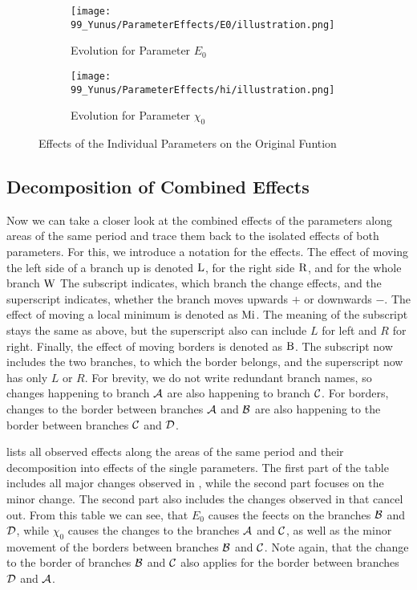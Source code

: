 \begin{figure}
	\centering
	\begin{subfigure}{0.4\textwidth}
		\texttt{[image: 99\_Yunus/ParameterEffects/E0/illustration.png]}
		\caption{Evolution for Parameter $E_0$}
		\label{fig:yunus.function.evolution.e0}
	\end{subfigure}
	\begin{subfigure}{0.4\textwidth}
		\texttt{[image: 99\_Yunus/ParameterEffects/hi/illustration.png]}
		\caption{Evolution for Parameter $\chi_0$}
		\label{fig:yunus.function.evolution.hi}
	\end{subfigure}
	\caption{Effects of the Individual Parameters on the Original Funtion}
\end{figure}

\subsection{Decomposition of Combined Effects}
\label{sec:yunus.param.effects.decomposition}

Now we can take a closer look at the combined effects of the parameters along areas of the same period and trace them back to the isolated effects of both parameters.
For this, we introduce a notation for the effects.
The effect of moving the left side of a branch up is denoted $\operatorname{L}$, for the right side $\operatorname{R}$, and for the whole branch $\operatorname{W}$
The subscript indicates, which branch the change effects, and the superscript indicates, whether the branch moves upwards $+$ or downwards $-$.
The effect of moving a local minimum is denoted as $\operatorname{Mi}$.
The meaning of the subscript stays the same as above, but the superscript also can include $L$ for left and $R$ for right.
Finally, the effect of moving borders is denoted as $\operatorname{B}$.
The subscript now includes the two branches, to which the border belongs, and the superscript now has only $L$ or $R$.
For brevity, we do not write redundant branch names, so changes happening to branch $\mathcal{A}$ are also happening to branch $\mathcal{C}$.
For borders, changes to the border between branches $\mathcal{A}$ and $\mathcal{B}$ are also happening to the border between branches $\mathcal{C}$ and $\mathcal{D}$.

 lists all observed effects along the areas of the same period and their decomposition into effects of the single parameters.
The first part of the table includes all major changes observed in , while the second part focuses on the minor change.
The second part also includes the changes observed in  that cancel out.
From this table we can see, that $E_0$ causes the feects on the branches $\mathcal{B}$ and $\mathcal{D}$, while $\chi_0$ causes the changes to the branches $\mathcal{A}$ and $\mathcal{C}$, as well as the minor movement of the borders between branches $\mathcal{B}$ and $\mathcal{C}$.
Note again, that the change to the border of branches $\mathcal{B}$ and $\mathcal{C}$ also applies for the border between branches $\mathcal{D}$ and $\mathcal{A}$.

